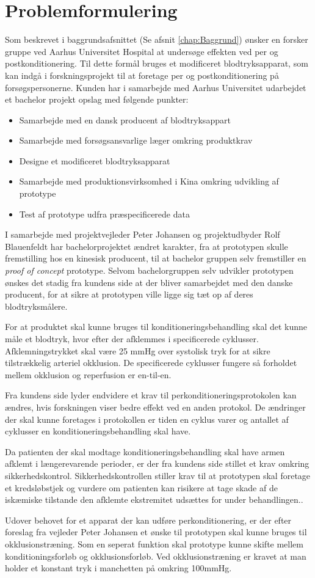 \chapter{Problemformulering}
Som beskrevet i baggrundsafsnittet (Se afsnit \ref{chap:Baggrund}) ønsker en forsker gruppe ved Aarhus Universitet Hospital at undersøge effekten ved per og postkonditionering. Til dette formål bruges et modificeret blodtryksapparat, som kan indgå i forskningsprojekt til at foretage per og postkonditionering på forsøgspersonerne. Kunden har i samarbejde med Aarhus Universitet udarbejdet et bachelor projekt opslag med følgende punkter:
\begin{itemize}
	\item Samarbejde med en dansk producent af blodtryksappart
	\item Samarbejde med forsøgsansvarlige læger omkring produktkrav
	\item Designe et modificeret blodtryksapparat
	\item Samarbejde med produktionsvirksomhed i Kina omkring udvikling af prototype 
	\item Test af prototype udfra præspecificerede data
\end{itemize}

I samarbejde med projektvejleder Peter Johansen og projektudbyder Rolf Blauenfeldt har bachelorprojektet ændret karakter, fra at prototypen skulle fremstilling hos en kinesisk producent, til at bachelor gruppen selv fremstiller en \textit{proof of concept} prototype. Selvom bachelorgruppen selv udvikler prototypen ønskes det stadig fra kundens side at der bliver samarbejdet med den danske producent, for at sikre at prototypen ville ligge sig tæt op af deres blodtryksmålere.

For at produktet skal kunne bruges til konditioneringsbehandling skal det kunne måle et blodtryk, hvor efter der afklemmes i specificerede cyklusser. Afklemningstrykket skal være 25 mmHg over systolisk tryk for at sikre tilstrækkelig arteriel okklusion. De specificerede cyklusser fungere så forholdet mellem okklusion og reperfusion er en-til-en. 

Fra kundens side lyder endvidere et krav til perkonditioneringsprotokolen kan ændres, hvis forskningen viser bedre effekt ved en anden protokol. De ændringer der skal kunne foretages i protokollen er tiden en cyklus varer og antallet af cyklusser en konditioneringsbehandling skal have. 

Da patienten der skal modtage konditioneringsbehandling skal have armen afklemt i længerevarende perioder, er der fra kundens side stillet et krav omkring sikkerhedskontrol. Sikkerhedskontrollen stiller krav til at prototypen skal foretage et kredsløbstjek og vurdere om patienten kan risikere at tage skade af de iskæmiske tilstande den afklemte ekstremitet udsættes for under behandlingen..

Udover behovet for et apparat der kan udføre perkonditionering, er der efter foreslag fra vejleder Peter Johansen et ønske til prototypen skal kunne bruges til okklusionstræning. Som en seperat funktion skal prototype kunne skifte mellem konditioningsforløb og okklusionsforløb. Ved okklusionstræning er kravet at man holder et konstant tryk i manchetten på omkring 100mmHg. 

